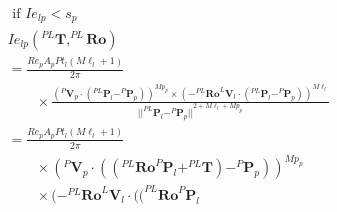         
                \begin{equation}
                    \label{eqn:model_coor_extend}
                    \begin{aligned}
                        &\text { if } Ie_{lp}<s_p \\
                        &Ie_{lp}(^{PL}\boldsymbol{T},^{PL}\boldsymbol{Ro}) \\&= \frac{Re_pA_pPt_l(M\ell_{l}+1)}{2 \pi} 
                        \\
                        &\qquad \times
                            \frac{ 
                            {(
                                ^{P}\boldsymbol{V}_p 
                                \cdot 
                                (
                                    ^{PL}\boldsymbol{P}_l- ^{P}\boldsymbol{P}_p
                                )
                            )}
                            ^{Mp_{p}}
                            \times 
                            {(
                                -^{PL}\boldsymbol{Ro}^{L}\boldsymbol{V}_l 
                                \cdot 
                                ({
                                    ^{PL}\boldsymbol{P}_l
                                    - ^{P}\boldsymbol{P}_p
                                })
                            )}^{M\ell_{l}}
                        } 
                            {{||^{PL}\boldsymbol{P}_l- ^{P}\boldsymbol{P}_p||}^{2+M\ell_l+Mp_p}}\\
                            &= \frac{Re_pA_pPt_l(M\ell_{l}+1)}{2 \pi}\\
                            &\qquad\times 
                            {( ^{P}\boldsymbol{V}_p \cdot 
                                    (
                                        (
                                            ^{PL} \boldsymbol{Ro}^{P}\boldsymbol{P}_l
                                            + ^{PL}\boldsymbol{T}
                                        )
                                        - ^{P}\boldsymbol{P}_p
                                    )
                                )}^{Mp_{p}}\\
                        &\qquad\times
                        {
                                    (
                                        -^{PL}\boldsymbol{Ro}^{L}\boldsymbol{V}_l 
                                        \cdot 
                                        (
                                            (
                                                ^{PL}\boldsymbol{Ro}^{P}\boldsymbol{P}_l
}
\end{aligned}
\end{equation}
